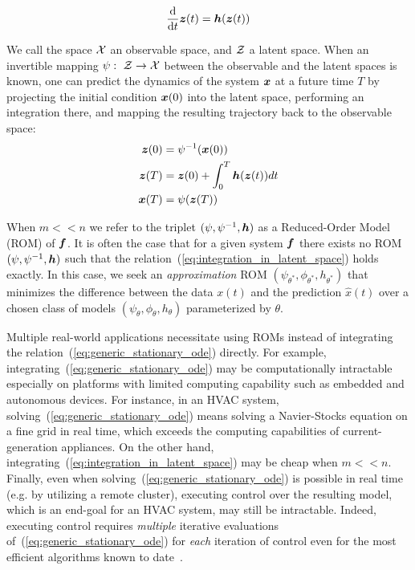 \begin{equation}
    \label{eq:latent_stationary_ode}
        \frac{\mathrm{d}}{\mathrm{d}t}\boldsymbol{z}(t) = \boldsymbol{h}(\boldsymbol{z}(t))
\end{equation}

We call the space $\operatorname{\mathcal{X}}$ an observable space, and $\operatorname{\mathcal{Z}}$ a latent space. When an invertible mapping $\psi:\ \operatorname{\mathcal{Z}} \to \operatorname{\mathcal{X}}$ between the observable and the latent spaces is known, one can predict the dynamics of the system $\boldsymbol{x}$ at a future time $T$ by projecting the initial condition $\boldsymbol{x}(0)$ into the latent space, performing an integration there, and mapping the resulting trajectory back to the observable space:
\begin{equation}
\label{eq:integration_in_latent_space}
\begin{split}
    \boldsymbol{z}(0) & = \psi^{-1}(\boldsymbol{x}(0)) \\
    \boldsymbol{z}(T) & = \boldsymbol{z}(0) + \int_{0}^T\boldsymbol{h}(\boldsymbol{z}(t))dt \\
    \boldsymbol{x}(T) & = \psi(\boldsymbol{z}(T))
\end{split}
\end{equation}

When $m << n$ we refer to the triplet $(\psi, \psi^{-1}, \boldsymbol{h})$ as a Reduced-Order Model (ROM) of $\boldsymbol{f}$. It is often the case that for a given system $\boldsymbol{f}$ there exists no ROM $(\psi, \psi^{-1}, \boldsymbol{h})$ such that the relation~(\ref{eq:integration_in_latent_space}) holds exactly. In this case, we seek an \textit{approximation} ROM $(\psi_{\theta^*}, \phi_{\theta^*}, h_{\theta^*})$ that minimizes the difference between the data $x(t)$ and the prediction $\hat{x}(t)$ over a chosen class of models $(\psi_\theta, \phi_\theta, h_\theta)$ parameterized by $\theta$.

Multiple real-world applications necessitate using ROMs instead of integrating the relation~(\ref{eq:generic_stationary_ode}) directly. For example, integrating~(\ref{eq:generic_stationary_ode}) may be computationally intractable especially on platforms with limited computing capability such as embedded and autonomous devices. For instance, in an HVAC system, solving~(\ref{eq:generic_stationary_ode}) means solving a Navier-Stocks equation on a fine grid in real time, which exceeds the computing capabilities of current-generation appliances. On the other hand, integrating~(\ref{eq:integration_in_latent_space}) may be cheap when $m << n$. Finally, even when solving~(\ref{eq:generic_stationary_ode}) is possible in real time (e.g. by utilizing a remote cluster), executing control over the resulting model, which is an end-goal for an HVAC system, may still be intractable. Indeed, executing control requires \textit{multiple} iterative evaluations of~(\ref{eq:generic_stationary_ode}) for \textit{each} iteration of control even for the most efficient algorithms known to date~\cite{duriez2017machine}. 

